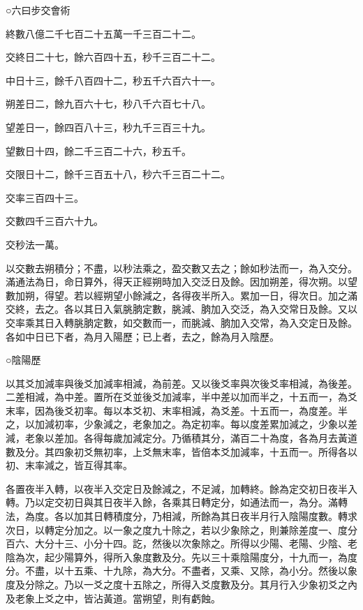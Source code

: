 
\begin{pinyinscope}

 ○六曰步交會術



 終數八億二千七百二十五萬一千三百二十二。



 交終日二十七，餘六百四十五，秒千三百二十二。



 中日十三，餘千八百四十二，秒五千六百六十一。



 朔差日二，餘九百六十七，秒八千六百七十八。



 望差日一，餘四百八十三，秒九千三百三十九。



 望數日十四，餘二千三百二十六，秒五千。



 交限日十二，餘千三百五十八，秒六千三百二十二。



 交率三百四十三。



 交數四千三百六十九。



 交秒法一萬。



 以交數去朔積分；不盡，以秒法乘之，盈交數又去之；餘如秒法而一，為入交分。滿通法為日，命日算外，得天正經朔時加入交泛日及餘。因加朔差，得次朔。以望數加朔，得望。若以經朔望小餘減之，各得夜半所入。累加一日，得次日。加之滿交終，去之。各以其日入氣朓朒定數，朓減、朒加入交泛，為入交常日及餘。又以交率乘其日入轉朓朒定數，如交數而一，而朓減、朒加入交常，為入交定日及餘。各如中日已下者，為月入陽歷；已上者，去之，餘為月入陰歷。



 ○陰陽歷



 以其爻加減率與後爻加減率相減，為前差。又以後爻率與次後爻率相減，為後差。二差相減，為中差。置所在爻並後爻加減率，半中差以加而半之，十五而一，為爻末率，因為後爻初率。每以本爻初、末率相減，為爻差。十五而一，為度差。半之，以加減初率，少象減之，老象加之。為定初率。每以度差累加減之，少象以差減，老象以差加。各得每歲加減定分。乃循積其分，滿百二十為度，各為月去黃道數及分。其四象初爻無初率，上爻無末率，皆倍本爻加減率，十五而一。所得各以初、末率減之，皆互得其率。



 各置夜半入轉，以夜半入交定日及餘減之，不足減，加轉終。餘為定交初日夜半入轉。乃以定交初日與其日夜半入餘，各乘其日轉定分，如通法而一，為分。滿轉法，為度。各以加其日轉積度分，乃相減，所餘為其日夜半月行入陰陽度數。轉求次日，以轉定分加之。以一象之度九十除之，若以少象除之，則兼除差度一、度分百六、大分十三、小分十四。訖，然後以次象除之。所得以少陽、老陽、少陰、老陰為次，起少陽算外，得所入象度數及分。先以三十乘陰陽度分，十九而一，為度分。不盡，以十五乘、十九除，為大分。不盡者，又乘、又除，為小分。然後以象度及分除之。乃以一爻之度十五除之，所得入爻度數及分。其月行入少象初爻之內及老象上爻之中，皆沾黃道。當朔望，則有虧蝕。




\end{pinyinscope}
